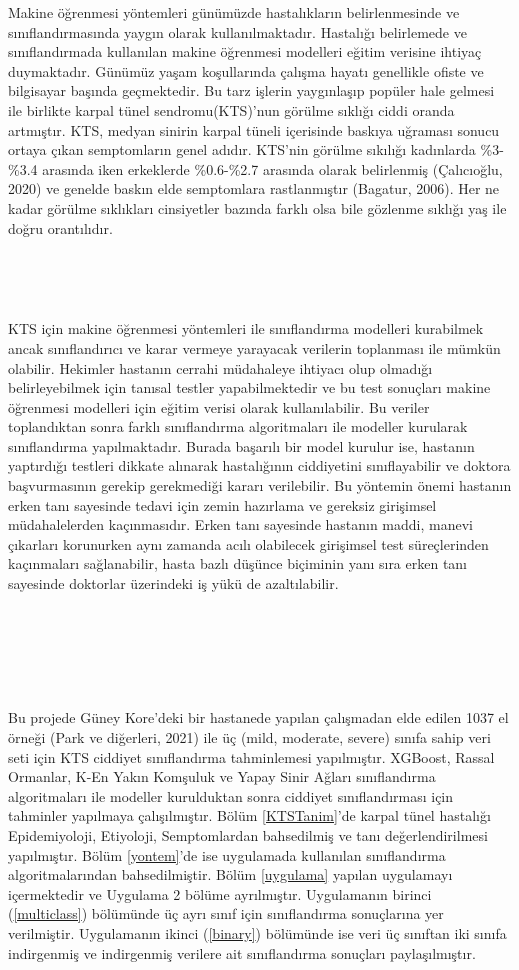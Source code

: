 \documentclass[12pt,twoside]{deuthesis}
\begin{document}
Makine öğrenmesi yöntemleri günümüzde hastalıkların belirlenmesinde ve sınıflandırmasında yaygın olarak kullanılmaktadır. Hastalığı belirlemede ve sınıflandırmada kullanılan makine öğrenmesi modelleri eğitim verisine ihtiyaç duymaktadır. Günümüz yaşam koşullarında çalışma hayatı genellikle ofiste ve bilgisayar başında geçmektedir. Bu tarz işlerin yaygınlaşıp popüler hale gelmesi ile birlikte karpal tünel sendromu(KTS)'nun görülme sıklığı ciddi oranda artmıştır. KTS, medyan sinirin karpal tüneli içerisinde baskıya uğraması sonucu ortaya çıkan semptomların genel adıdır. KTS'nin görülme sıkılığı kadınlarda \%3-\%3.4 arasında iken erkeklerde \%0.6-\%2.7 arasında olarak belirlenmiş (Çalıcıoğlu, 2020) ve genelde baskın elde semptomlara rastlanmıştır (Bagatur, 2006). Her ne kadar görülme sıklıkları cinsiyetler bazında farklı olsa bile gözlenme sıklığı yaş ile doğru orantılıdır.
~

~

~

KTS için makine öğrenmesi yöntemleri ile sınıflandırma modelleri kurabilmek ancak sınıflandırıcı ve karar vermeye yarayacak verilerin toplanması ile mümkün olabilir. Hekimler hastanın cerrahi müdahaleye ihtiyacı olup olmadığı belirleyebilmek için tanısal testler yapabilmektedir ve bu test sonuçları makine öğrenmesi modelleri için eğitim verisi olarak kullanılabilir. Bu veriler toplandıktan sonra farklı sınıflandırma algoritmaları ile modeller kurularak sınıflandırma yapılmaktadır. Burada başarılı bir model kurulur ise, hastanın yaptırdığı testleri dikkate alınarak hastalığının ciddiyetini sınıflayabilir ve doktora başvurmasının gerekip gerekmediği kararı verilebilir. Bu yöntemin önemi hastanın erken tanı sayesinde tedavi için zemin hazırlama ve gereksiz girişimsel müdahalelerden kaçınmasıdır. Erken tanı sayesinde hastanın maddi, manevi çıkarları korunurken aynı zamanda acılı olabilecek girişimsel test süreçlerinden kaçınmaları sağlanabilir, hasta bazlı düşünce biçiminin yanı sıra erken tanı sayesinde doktorlar üzerindeki iş yükü de azaltılabilir.

~

~

~

Bu projede Güney Kore'deki bir hastanede yapılan çalışmadan elde edilen 1037 el örneği (Park ve diğerleri, 2021) ile üç (mild, moderate, severe) sınıfa sahip veri seti için KTS ciddiyet sınıflandırma tahminlemesi yapılmıştır. XGBoost, Rassal Ormanlar, K-En Yakın Komşuluk ve Yapay Sinir Ağları sınıflandırma algoritmaları ile modeller kurulduktan sonra ciddiyet sınıflandırması için tahminler yapılmaya çalışılmıştır. Bölüm \ref{KTSTanim}'de karpal tünel hastalığı Epidemiyoloji, Etiyoloji, Semptomlardan bahsedilmiş ve tanı değerlendirilmesi yapılmıştır. Bölüm \ref{yontem}'de ise uygulamada kullanılan sınıflandırma algoritmalarından bahsedilmiştir. Bölüm \ref{uygulama} yapılan uygulamayı içermektedir ve Uygulama 2 bölüme ayrılmıştır. Uygulamanın birinci (\ref{multiclass}) bölümünde üç ayrı sınıf için sınıflandırma sonuçlarına yer verilmiştir. Uygulamanın ikinci (\ref{binary}) bölümünde ise veri üç sınıftan iki sınıfa indirgenmiş ve indirgenmiş verilere ait sınıflandırma sonuçları paylaşılmıştır.
\end{document}
